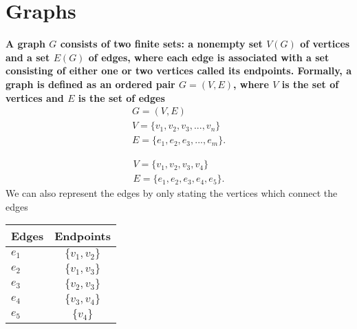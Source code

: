 \documentclass{report}
\begin{document}
    \section{\LARGE Graphs}
    \smallbreak \noindent
    \begin{definition}
    \textbf{ A \textbf{graph} $G$ consists of two finite sets: a nonempty set $V(G)$ of vertices and a set $E(G)$ of edges, where each edge is associated with a set consisting of either one or two vertices called its endpoints. Formally, a \textbf{graph} is defined as an ordered pair $G = (V,E)$, where $V$ is the set of vertices and $E$ is the set of edges
        \begin{align*}
            G = (V,E) \\
            V = \{v_{1},v_{2},v_{3},...,v_{n}\} \\
            E = \{e_{1}, e_{2}, e_{3}, ..., e_{m}\}
        .\end{align*}
} 
    \end{definition}
    \bigbreak \noindent 
    \begin{minipage}{0.47\textwidth}
    \end{minipage}
    \begin{minipage}{0.47\textwidth}
    \begin{align*}
        V = \{v_{1},v_{2}, v_{3}, v_{4}\} \\
        E = \{e_{1}, e_{2},e_{3},e_{4},e_{5}\}
    .\end{align*}
    We can also represent the edges by only stating the vertices which connect the edges
        \begin{center}
        \begin{tabular}{|l|c|}
        \hline
        Edges & Endpoints \\
        	\hline
        $e_{1}$& $\{v_{1},v_{2}\} $   \\
        	\hline
        $e_{2}$ & $\{v_{1}, v_{3}\} $ \\
        \hline
        $e_{3}$ & $\{v_{2}, v_{3}\} $ \\
        \hline 
        $e_{4}$ & $\{v_{3}, v_{4}\} $ \\
        \hline
        $e_{5}$ & $\{v_{4}\} $ \\
        \hline
        \end{tabular}
    \end{center}
    \end{minipage}

    \pagebreak \bigbreak \noindent 
\end{document}
